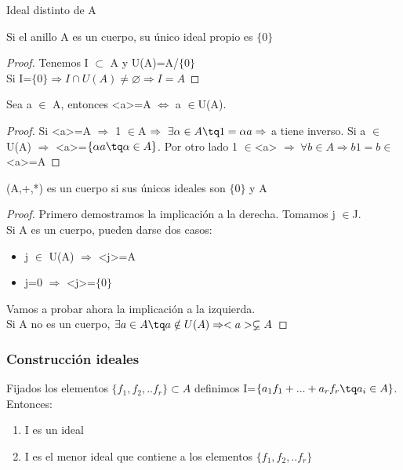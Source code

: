 \documentclass[nochap]{apuntes}
\begin{document}
\begin{defn}
 Ideal distinto de A
\end{defn}

\begin{corol}
 Si el anillo A es un cuerpo, su único ideal propio es $\{0\}$
\end{corol}
\begin{proof}
Tenemos  I $\subset$ A y U(A)=A/$\{0\}$\\
Si I=$\{0\} \Rightarrow I \cap U(A) \neq \varnothing \Rightarrow I=A$
\end{proof}

\obs Sea a $\in$ A, entonces <a>=A $\Leftrightarrow$ a $\in$U(A).
\begin{proof}
 Si <a>=A $\Rightarrow$ 1 $\in$A  $\Rightarrow \ \exists \alpha \in A \tq 1=\alpha a \Rightarrow$  a tiene inverso.
 Si a $\in$ U(A) $\Rightarrow$  <a>=$\{\alpha a \tq \alpha \in A\}$. Por otro lado 1 $\in$<a> $\Rightarrow \ \forall b \in A \Rightarrow b1=b \in$<a>=A  
\end{proof}

\begin{theorem}
 (A,+,*) es un cuerpo si sus únicos ideales son $\{0\}$  y A
\end{theorem}
\begin{proof}
 Primero demostramos la implicación a la derecha. Tomamos j $\in$J.\\
 Si A es un cuerpo, pueden darse dos casos: 
 \begin{itemize}
  \item j $\in$ U(A) $\Rightarrow$ <j>=A
  \item j=0 $\Rightarrow$ <j>=$\{0\}$
 \end{itemize}
Vamos a probar ahora la implicación a la izquierda.\\
Si A no es un cuerpo, $\exists a \in A \tq a \notin U(A) \Rightarrow <a>\varsubsetneq A $
\end{proof}

\subsubsection{Construcción ideales}
Fijados los elementos $\{f_1, f_2, .. f_r\}\subset A$  definimos I=$\{a_1f_1+...+a_rf_r \tq a_i \in A\}$. Entonces:
\begin{enumerate}
 \item I es un ideal
 \item I es el menor ideal que contiene a los elementos $\{f_1, f_2, .. f_r\}$
\end{enumerate}
\end{document}
